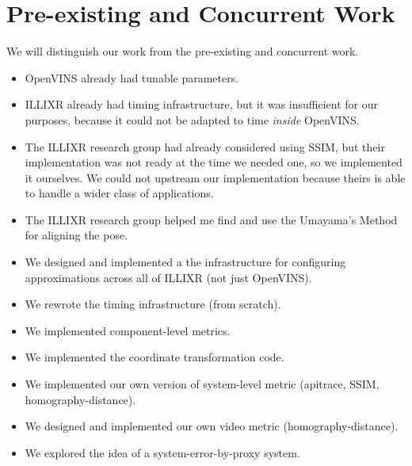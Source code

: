 \documentclass[sigconf,review,screen]{acmart}
\begin{document}



\appendix
\section{Pre-existing and Concurrent Work}
We will distinguish our work from the pre-existing and concurrent work.

\begin{itemize}
\item OpenVINS already had tunable parameters.
\item ILLIXR already had timing infrastructure, but it was insufficient for our purposes, because it could not be adapted to time \textit{inside} OpenVINS.
\item The ILLIXR research group had already considered using SSIM, but their implementation was not ready at the time we needed one, so we implemented it ourselves. We could not upstream our implementation because theirs is able to handle a wider class of applications.
\item The ILLIXR research group helped me find and use the Umayama's Method for aligning the pose.
\end{itemize}

\begin{itemize}
\item We designed and implemented a the infrastructure for configuring approximations across all of ILLIXR (not just OpenVINS).
\item We rewrote the timing infrastructure (from scratch).
\item We implemented component-level metrics.
\item We implemented the coordinate transformation code.
\item We implemented our own version of system-level metric (apitrace, SSIM, homography-distance).
\item We designed and implemented our own video metric (homography-distance).
\item We explored the idea of a system-error-by-proxy system.
\end{itemize}
\end{document}
